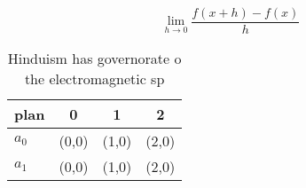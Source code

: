 \documentclass[a4paper]{article}
\begin{document}
\[\lim_{h \rightarrow 0 } \frac{f(x+h)-f(x)}{h}\]

\begin{table}
\begin{adjustbox}{width=0.5\columnwidth}
\begin{tabular}{|l|l|l|l|}
\hline
\textbf{plan} & \multicolumn{1}{c|}{\textbf{0}} & \multicolumn{1}{c|}{\textbf{1}} & \multicolumn{1}{c|}{\textbf{2}} \\ \hline
\textbf{$a_0$}  & (0,0) & (1,0) & (2,0) \\ \hline
\textbf{$a_1$}  & (0,0) & (1,0) & (2,0) \\ \hline
\end{tabular}
\end{adjustbox}
\caption{Hinduism has governorate o the electromagnetic sp
}
\end{table}
\end{document}
